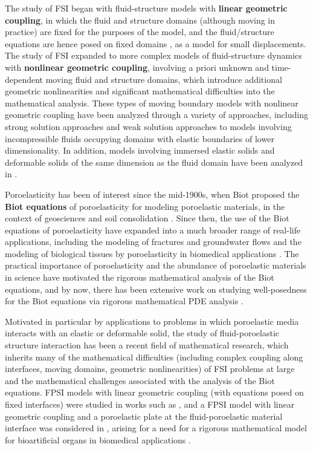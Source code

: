 \documentclass[11pt]{article}
\theoremstyle{definition}
\begin{document}
The study of FSI began with fluid-structure models with \textbf{linear geometric coupling}, in which the fluid and structure domains (although moving in practice) are fixed for the purposes of the model, and the fluid/structure equations are hence posed on fixed domains \cite{barGruLasTuff2, BarGruLasTuff, KukavicaTuffahaZiane}, as a model for small displacements. The study of FSI expanded to more complex models of fluid-structure dynamics with \textbf{nonlinear geometric coupling}, involving a priori unknown and time-dependent moving fluid and structure domains, which introduce additional geometric nonlinearities and significant mathematical difficulties into the mathematical analysis. These types of moving boundary models with nonlinear geometric coupling have been analyzed through a variety of approaches, including strong solution approaches \cite{BdV1, Lequeurre, Grandmont16, FSIforBIO_Lukacova} and weak solution approaches \cite{CDEM, CG, MuhaCanic13, LengererRuzicka, FSIforBIO_Lukacova} to models involving incompressible fluids occupying domains with elastic boundaries of lower dimensionality. In addition, models involving immersed elastic solids and deformable solids of the same dimension as the fluid domain have been analyzed in \cite{BKS24, BrKS24, CSS1, CSS2, ChengShkollerCoutand, ChenShkoller, Kuk, IgnatovaKukavica, ignatova2014well, Raymond}.

Poroelasticity has been of interest since the mid-1900s, when Biot proposed the \textbf{Biot equations} of poroelasticity for modeling poroelastic materials, in the context of geosciences and soil consolidation \cite{Biot1, Biot2}. Since then, the use of the Biot equations of poroelasticity have expanded into a much broader range of real-life applications, including the modeling of fractures and groundwater flows \cite{GWG15, LDQ11} and the modeling of biological tissues by poroelasticity in biomedical applications \cite{FluidsCanic,YifanDES,CGH14, YRC14}. The practical importance of poroelasticity and the abundance of poroelastic materials in science have motivated the rigorous mathematical analysis of the Biot equations, and by now, there has been extensive work on studying well-posedness for the Biot equations via rigorous mathematical PDE analysis \cite{BGM23, Biotwell1, Biotwell2, Biotwell3, Biotwell4, Biotwell5, Biotwell6, Biotwell7, Biotwell8,BiotWell22,BiotWell23}.

Motivated in particular by applications to problems in which poroelastic media interacts with an elastic or deformable solid, the study of fluid-poroelastic structure interaction has been a recent field of mathematical research, which inherits many of the mathematical difficulties (including complex coupling along interfaces, moving domains, geometric nonlinearities) of FSI problems at large and the mathematical challenges associated with the analysis of the Biot equations. FPSI models with linear geometric coupling (with equations posed on fixed interfaces) were studied in works such as \cite{AEN19, Ces17, Sho05}, and a FPSI model with linear geometric coupling and a poroelastic plate at the fluid-poroelastic material interface was considered in \cite{BCMW21}, arising for a need for a rigorous mathematical model for bioartificial organs in biomedical applications \cite{FluidsCanic}. 
\end{document}
